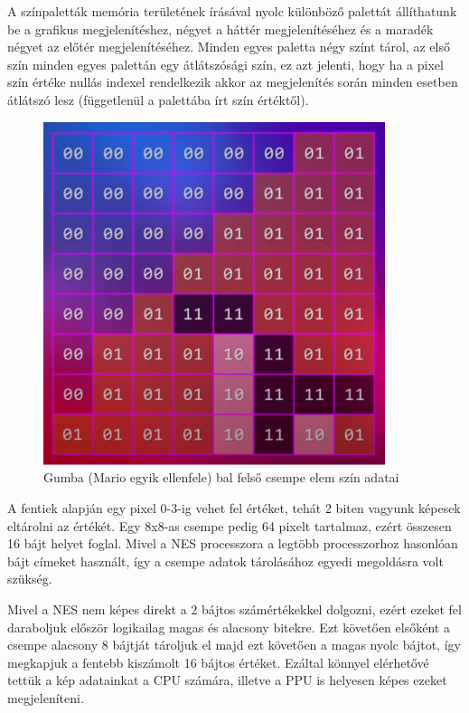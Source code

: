 	A színpaletták memória területének írásával nyolc különböző palettát állíthatunk be a grafikus megjelenítéshez, négyet a háttér megjelenítéséhez és a maradék négyet az előtér megjelenítéséhez. Minden egyes paletta négy színt tárol, az első szín minden egyes palettán egy átlátszósági szín, ez azt jelenti, hogy ha a pixel szín értéke nullás indexel rendelkezik akkor az megjelenítés során minden esetben átlátszó lesz (függetlenül a palettába írt szín értéktől).
	
	\begin{figure}[H]
	\centering
	\includegraphics[width=100mm, keepaspectratio]{figures/Gumba-tile}
	\caption{Gumba (Mario egyik ellenfele) bal felső csempe elem szín adatai \cite{Neshacker_ppu}}
	\label{fig:Gumba-tile}
	\end{figure}
	
	A fentiek alapján egy pixel 0-3-ig vehet fel értéket, tehát 2 biten vagyunk képesek eltárolni az értékét. Egy 8x8-as csempe pedig 64 pixelt tartalmaz, ezért összesen 16 bájt helyet foglal. Mivel a NES processzora a legtöbb processzorhoz hasonlóan bájt címeket használt, így a csempe adatok tárolásához egyedi megoldásra volt szükség.
	
	Mivel a NES nem képes direkt a 2 bájtos számértékekkel dolgozni, ezért ezeket fel daraboljuk először logikailag magas és alacsony bitekre. Ezt követően elsőként a csempe alacsony 8 bájtját tároljuk el majd ezt követően a magas nyolc bájtot, így megkapjuk a fentebb kiszámolt 16 bájtos értéket. Ezáltal könnyel elérhetővé tettük a kép adatainkat a CPU számára, illetve a PPU is helyesen képes ezeket megjeleníteni.
	
